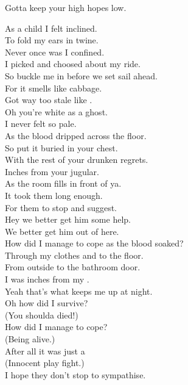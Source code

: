 Gotta keep your high hopes low. \\




As a child I felt inclined. \\
To fold my ears in twine. \\
Never once was I confined. \\
I picked and choosed about my ride. \\
So buckle me in before we set sail ahead. \\
For it smells like cabbage. \\
Got way too stale like . \\

Oh you're white as a ghost. \\
I never felt so pale. \\
As the blood dripped across the floor. \\

So put it buried in your chest. \\
With the rest of your drunken regrets. \\
Inches from your jugular. \\
As the room fills in front of ya. \\
It took them long enough. \\
For them to stop and suggest. \\
Hey we better get him some help. \\
We better get him out of here. \\

How did I manage to cope as the blood soaked? \\
Through my clothes and to the floor. \\
From outside to the bathroom door. \\
I was inches from my . \\
Yeah that's what keeps me up at night. \\

Oh how did I survive? \\
(You shoulda died!) \\
How did I manage to cope? \\
(Being alive.) \\
After all it was just a \\
(Innocent play fight.) \\
I hope they don't stop to sympathise. \\

